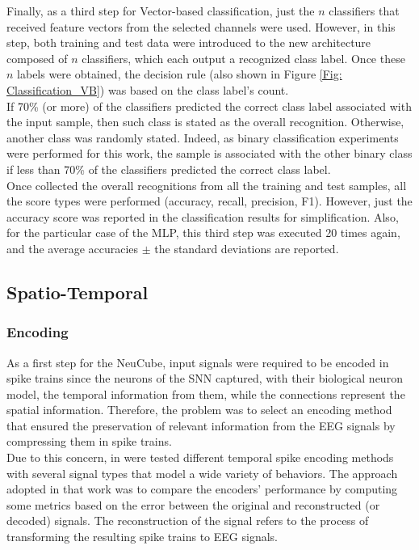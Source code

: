 Finally, as a third step for Vector-based classification, just the $n$ classifiers that received feature vectors from the selected channels were used. However, in this step, both training and test data were introduced to the new architecture composed of $n$ classifiers, which each output a recognized class label. Once these $n$ labels were obtained, the decision rule (also shown in Figure \ref{Fig: Classification_VB}) was based on the class label's count.\\

If 70\% (or more) of the classifiers predicted the correct class label associated with the input sample, then such class is stated as the overall recognition. Otherwise, another class was randomly stated. Indeed, as binary classification experiments were performed for this work, the sample is associated with the other binary class
if less than 70\% of the classifiers predicted the correct class label.\\

Once collected the overall recognitions from all the training and test samples, all the score types were performed (accuracy, recall, precision, F1). However, just the accuracy score was reported in the classification results for simplification. Also, for the particular case of the MLP, this third step was executed 20 times again, and the average accuracies $\pm$ the standard deviations are reported.\\

\subsection{Spatio-Temporal}
\subsubsection{Encoding}
As a first step for the NeuCube, input signals were required to be encoded in spike trains since the neurons of the SNN captured, with their biological neuron model, the temporal information from them, while the connections represent the spatial information. Therefore, the problem was to select an encoding method that ensured the preservation of relevant information from the EEG signals by compressing them in spike trains.\\

Due to this concern, in \cite{petro2019selection} were tested different temporal spike encoding methods with several signal types that model a wide variety of behaviors. The approach adopted in that work was to compare the encoders' performance by computing some metrics based on the error between the original and reconstructed (or decoded) signals. The reconstruction of the signal refers to the process of transforming the resulting spike trains to EEG signals.\\

